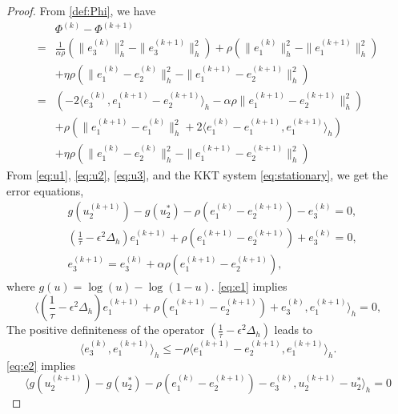 \begin{proof}
From \eqref{def:Phi}, we have
\begin{equation}
    \begin{aligned}
    &\Phi^{(k)}-\Phi^{(k+1)}\\
    =&\frac{1}{\alpha \rho}(\|e_3^{(k)}\|_h^2-\|e_3^{(k+1)}\|_h^2)+\rho (\|e_1^{(k)}\|_h^2-\|e_1^{(k+1)}\|_h^2)\\
    &+\eta \rho (\|e_1^{(k)}-
    e_2^{(k)}\|_h^2-\|e_1^{(k+1)}-
    e_2^{(k+1)}\|_h^2)\\
    =&(-2\langle e_3^{(k)},e_1^{(k+1)}-e_2^{(k+1)}\rangle_h-\alpha \rho \|e_1^{(k+1)}-e_2^{(k+1)}\|_h^2)\\
    &+\rho (\|e_1^{(k+1)}-e_1^{(k)}\|_h^2
    +2\langle e_1^{(k)}-e_1^{(k+1)},e_1^{(k+1)}\rangle_h
    )\\
    &+\eta \rho (\|e_1^{(k)}-
    e_2^{(k)}\|_h^2-\|e_1^{(k+1)}-
    e_2^{(k+1)}\|_h^2)
\end{aligned}
\end{equation}
From \eqref{eq:u1}, \eqref{eq:u2}, \eqref{eq:u3}, and the KKT system \eqref{eq:stationary}, we get the error equations,
\begin{subequations}
    \begin{align}
        &g(u_2^{(k+1)})-g(u_2^*)-\rho(e_1^{(k)}-e_2^{(k+1)})-e_3^{(k)}=0,
        \label{eq:e2}
        \\
        &(\frac{1}{\tau}-\epsilon^2\Delta_h)e_1^{(k+1)}
        +\rho(e_1^{(k+1)}-e_2^{(k+1)})+e_3^{(k)}=0,
        \label{eq:e1}
        \\
        &e_3^{(k+1)}=e_3^{(k)}+\alpha \rho(e_1^{(k+1)}-e_2^{(k+1)}),
        \label{eq:e3}
    \end{align}
\end{subequations}
where $g(u)=\log(u)-\log(1-u)$. \eqref{eq:e1} implies
\begin{equation}
    \langle (\frac{1}{\tau}-\epsilon^2\Delta_h)e_1^{(k+1)}
        +\rho(e_1^{(k+1)}-e_2^{(k+1)})+e_3^{(k)}, e_1^{(k+1)} \rangle_h=0,
\end{equation}
The positive definiteness of the operator $(\frac{1}{\tau}-\epsilon^2\Delta_h)$ leads to
\begin{equation}\label{eq:inequality1}
    \langle e_3^{(k)},e_1^{(k+1)}\rangle_h 
    \leq
    -\rho \langle e_1^{(k+1)}-e_2^{(k+1)},e_1^{(k+1)}\rangle_h.
\end{equation}
\eqref{eq:e2} implies
\begin{equation}
    \langle g(u_2^{(k+1)})-g(u_2^*)-\rho(e_1^{(k)}-e_2^{(k+1)})-e_3^{(k)},u_2^{(k+1)}-u_2^* \rangle_h=0

\end{equation}
\end{proof}
